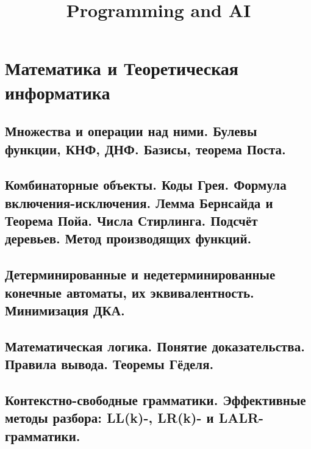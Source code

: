 \documentclass{article}
\title{Programming and AI} %
\begin{document}
	
\maketitle %
\tableofcontents
\section{Математика и Теоретическая информатика}





















\subsection{Множества и операции над ними. Булевы функции, КНФ, ДНФ. Базисы, теорема Поста.}

\subsection{Комбинаторные объекты. Коды Грея. Формула включения-исключения. Лемма Бернсайда и Теорема Пойа. Числа Стирлинга. Подсчёт деревьев. Метод производящих функций.}

\subsection{Детерминированные и недетерминированные конечные автоматы, их эквивалентность. Минимизация ДКА.}

\subsection{Математическая логика. Понятие доказательства. Правила вывода. Теоремы Гёделя.}

\subsection{Контекстно-свободные грамматики. Эффективные методы разбора: LL(k)-, LR(k)- и LALR-грамматики.}
\end{document}
